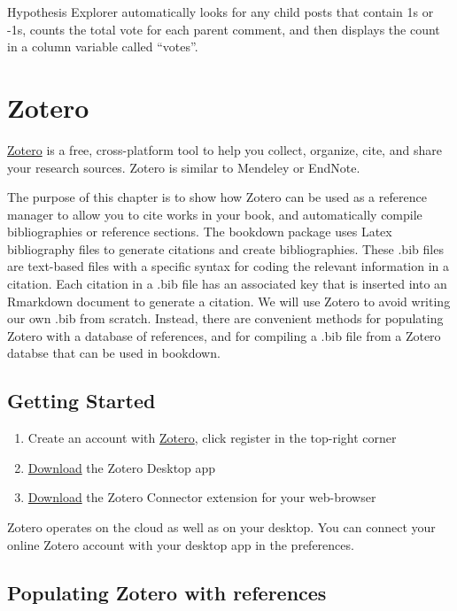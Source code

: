 \documentclass[]{book}
\providecommand{\tightlist}{%
  \setlength{\itemsep}{0pt}\setlength{\parskip}{0pt}}
\theoremstyle{definition}
\theoremstyle{definition}
\theoremstyle{definition}
\theoremstyle{remark}
\begin{document}
Hypothesis Explorer automatically looks for any child posts that contain
1s or -1s, counts the total vote for each parent comment, and then
displays the count in a column variable called ``votes''.

\chapter{Zotero}\label{zotero-1}

\href{https://www.zotero.org}{Zotero} is a free, cross-platform tool to
help you collect, organize, cite, and share your research sources.
Zotero is similar to Mendeley or EndNote.

The purpose of this chapter is to show how Zotero can be used as a
reference manager to allow you to cite works in your book, and
automatically compile bibliographies or reference sections. The bookdown
package uses Latex bibliography files to generate citations and create
bibliographies. These .bib files are text-based files with a specific
syntax for coding the relevant information in a citation. Each citation
in a .bib file has an associated key that is inserted into an Rmarkdown
document to generate a citation. We will use Zotero to avoid writing our
own .bib from scratch. Instead, there are convenient methods for
populating Zotero with a database of references, and for compiling a
.bib file from a Zotero databse that can be used in bookdown.

\section{Getting Started}\label{getting-started-1}

\begin{enumerate}
\def\labelenumi{\arabic{enumi}.}
\tightlist
\item
  Create an account with \href{https://www.zotero.org}{Zotero}, click
  register in the top-right corner
\item
  \href{https://www.zotero.org/download/}{Download} the Zotero Desktop
  app
\item
  \href{https://www.zotero.org/download/}{Download} the Zotero Connector
  extension for your web-browser
\end{enumerate}

Zotero operates on the cloud as well as on your desktop. You can connect
your online Zotero account with your desktop app in the preferences.

\section{Populating Zotero with
references}\label{populating-zotero-with-references}
\end{document}
